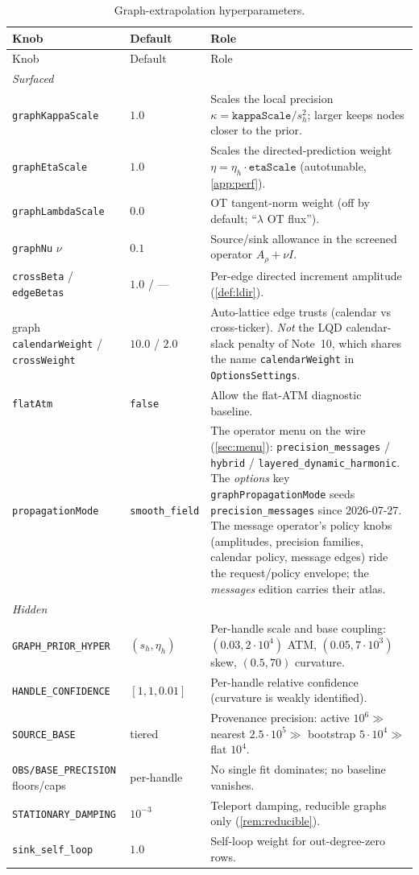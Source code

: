 \documentclass[11pt]{article}
\newcommand{\Arho}{A_{\rho}}
\begin{document}
\begin{longtable}{p{}p{}p{}}
\caption{Graph-extrapolation hyperparameters.}\label{tab:atlas}\\
\toprule Knob & Default & Role\\ \midrule
\endfirsthead \toprule Knob & Default & Role\\ \midrule \endhead
\multicolumn{3}{l}{\emph{Surfaced}}\\ \midrule
\texttt{graphKappaScale} & $1.0$ & Scales the local precision
$\kappa=\texttt{kappaScale}/s_h^2$; larger keeps nodes closer to the prior.\\
\texttt{graphEtaScale} & $1.0$ & Scales the directed-prediction weight
$\eta=\eta_h\cdot\texttt{etaScale}$ (autotunable, \cref{app:perf}).\\
\texttt{graphLambdaScale} & $0.0$ & OT tangent-norm weight (off by default;
``$\lambda$ OT flux'').\\
\texttt{graphNu} $\nu$ & $0.1$ & Source/sink allowance in the screened operator
$\Arho+\nu I$.\\
\texttt{crossBeta} / \texttt{edgeBetas} & $1.0$ / --- & Per-edge directed
increment amplitude (\cref{def:ldir}).\\
graph \texttt{calendarWeight} / \texttt{crossWeight} & $10.0$ / $2.0$ &
Auto-lattice edge trusts (calendar vs cross-ticker). \emph{Not} the LQD
calendar-slack penalty of Note~10, which shares the name
\texttt{calendarWeight} in \texttt{OptionsSettings}.\\
\texttt{flatAtm} & \texttt{false} & Allow the flat-ATM diagnostic baseline.\\
\texttt{propagationMode} & \texttt{smooth\_field} & The operator menu on
the wire
(\cref{sec:menu}): \texttt{precision\_messages} / \texttt{hybrid} /
\texttt{layered\_dynamic\_harmonic}.  The \emph{options} key
\texttt{graphPropagationMode} seeds \texttt{precision\_messages} since
2026-07-27. The message operator's policy
knobs (amplitudes, precision families, calendar policy, message edges) ride
the request/policy envelope; the \emph{messages} edition carries their
atlas.\\
\midrule
\multicolumn{3}{l}{\emph{Hidden}}\\ \midrule
\texttt{GRAPH\_PRIOR\_HYPER} & $(s_h,\eta_h)$ & Per-handle scale and base
coupling: $(0.03,2{\cdot}10^4)$ ATM, $(0.05,7{\cdot}10^3)$ skew, $(0.5,70)$
curvature.\\
\texttt{HANDLE\_CONFIDENCE} & $[1,1,0.01]$ & Per-handle relative confidence
(curvature is weakly identified).\\
\texttt{SOURCE\_BASE} & tiered & Provenance precision: active
$10^6\gg$ nearest $2.5{\cdot}10^5\gg$ bootstrap $5{\cdot}10^4\gg$ flat
$10^4$.\\
\texttt{OBS/BASE\_PRECISION} floors/caps & per-handle & No single fit dominates;
no baseline vanishes.\\
\texttt{STATIONARY\_DAMPING} & $10^{-3}$ & Teleport damping, reducible graphs
only (\cref{rem:reducible}).\\
\texttt{sink\_self\_loop} & $1.0$ & Self-loop weight for out-degree-zero rows.\\
\bottomrule
\end{longtable}
\end{document}

